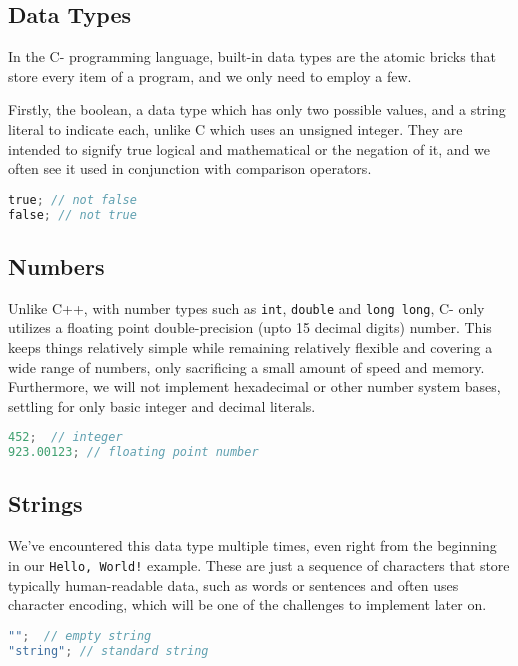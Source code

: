 \subsection{Data Types}

In the C- programming language, built-in data types are the atomic bricks that store every item of a program, and we only need to employ a few.

Firstly, the boolean, a data type which has only two possible values, and a string literal to indicate each, unlike C which uses an unsigned integer. They are intended to signify true logical and mathematical or the negation of it, and we often see it used in conjunction with comparison operators. 

\begin{lstlisting}[language=C]
true; // not false
false; // not true
\end{lstlisting}

\subsection{Numbers}

Unlike C++, with number types such as \verb+int+, \verb+double+ and \verb+long long+, C- only utilizes a floating point double-precision (upto 15 decimal digits) number. This keeps things relatively simple while remaining relatively flexible and covering a wide range of numbers, only sacrificing a small amount of speed and memory. Furthermore, we will not implement hexadecimal or other number system bases, settling for only basic integer and decimal literals.

\begin{lstlisting}[language=C]
452;  // integer
923.00123; // floating point number
\end{lstlisting}

\subsection{Strings}

We've encountered this data type multiple times, even right from the beginning in our \verb+Hello, World!+ example. These are just a sequence of characters that store typically human-readable data, such as words or sentences and often uses character encoding, which will be one of the challenges to implement later on. 

\begin{lstlisting}[language=C]
"";  // empty string
"string"; // standard string
\end{lstlisting}


